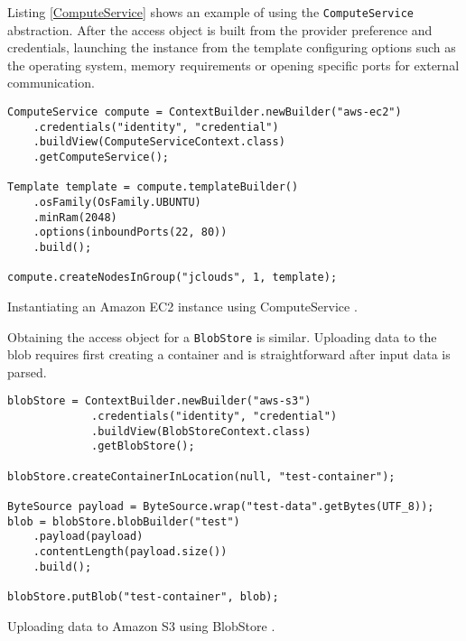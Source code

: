 Listing \ref{ComputeService} shows an example of using the \verb|ComputeService| abstraction. After the access object is built from the provider preference and credentials, launching the instance from the template configuring options such as the operating system, memory requirements or opening specific ports for external communication.

\begin{listing}[h]
	\centering
	\begin{minipage}{11.6cm}		
		\begin{verbatim}
ComputeService compute = ContextBuilder.newBuilder("aws-ec2")
    .credentials("identity", "credential")
    .buildView(ComputeServiceContext.class)
    .getComputeService();

Template template = compute.templateBuilder()
    .osFamily(OsFamily.UBUNTU)
    .minRam(2048)
    .options(inboundPorts(22, 80))
    .build();

compute.createNodesInGroup("jclouds", 1, template);
		\end{verbatim}
	\end{minipage}
	\caption{Instantiating an Amazon EC2 instance using ComputeService \cite{jclouds}.}
	\label{ComputeService}
\end{listing}

Obtaining the access object for a \verb|BlobStore| is similar. Uploading data to the blob requires first creating a container and is straightforward after input data is parsed.

\begin{listing}[h]
	\centering
	\begin{minipage}{12.5cm}
		\begin{verbatim}
blobStore = ContextBuilder.newBuilder("aws-s3")
             .credentials("identity", "credential")
             .buildView(BlobStoreContext.class)
             .getBlobStore();

blobStore.createContainerInLocation(null, "test-container");

ByteSource payload = ByteSource.wrap("test-data".getBytes(UTF_8));
blob = blobStore.blobBuilder("test")
    .payload(payload)
    .contentLength(payload.size())
    .build();

blobStore.putBlob("test-container", blob);
		\end{verbatim}
	\end{minipage}
	\caption{Uploading data to Amazon S3 using BlobStore \cite{jclouds}.}
	\label{BlobStore}
\end{listing}


